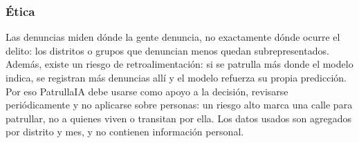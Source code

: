 \subsubsection{Ética}
Las denuncias miden dónde la gente denuncia, no exactamente dónde ocurre el delito: los distritos o grupos que denuncian menos quedan subrepresentados. Además, existe un riesgo de retroalimentación: si se patrulla más donde el modelo indica, se registran más denuncias allí y el modelo refuerza su propia predicción. Por eso PatrullaIA debe usarse como apoyo a la decisión, revisarse periódicamente y no aplicarse sobre personas: un riesgo alto marca una calle para patrullar, no a quienes viven o transitan por ella. Los datos usados son agregados por distrito y mes, y no contienen información personal.
